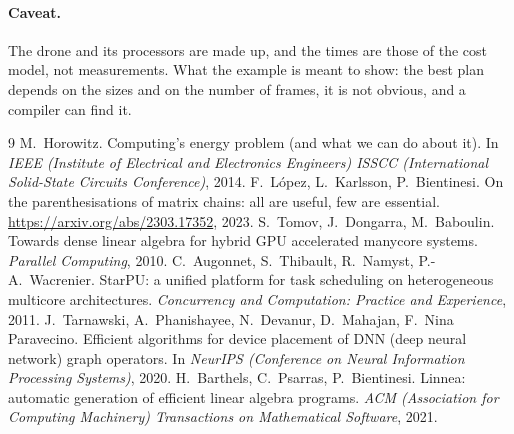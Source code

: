 \documentclass[11pt,a4paper]{article}
\begin{document}
\paragraph{Caveat.} The drone and its processors are made up, and the
times are those of the cost model, not measurements. What the example is
meant to show: the best plan depends on the sizes and on the number of
frames, it is not obvious, and a compiler can find it.

\begin{thebibliography}{9}
 M.~Horowitz. Computing's energy problem (and what we can
  do about it). In \emph{IEEE (Institute of Electrical and Electronics
  Engineers) ISSCC (International Solid-State Circuits Conference)}, 2014.
 F.~López, L.~Karlsson, P.~Bientinesi. On the
  parenthesisations of matrix chains: all are useful, few are essential.
  \url{https://arxiv.org/abs/2303.17352}, 2023.
 S.~Tomov, J.~Dongarra, M.~Baboulin. Towards dense linear
  algebra for hybrid GPU accelerated manycore systems. \emph{Parallel
  Computing}, 2010.
 C.~Augonnet, S.~Thibault, R.~Namyst, P.-A.~Wacrenier.
  StarPU: a unified platform for task scheduling on heterogeneous multicore
  architectures. \emph{Concurrency and Computation: Practice and
  Experience}, 2011.
 J.~Tarnawski, A.~Phanishayee, N.~Devanur, D.~Mahajan,
  F.~Nina Paravecino. Efficient algorithms for device placement of DNN
  (deep neural network) graph operators. In \emph{NeurIPS (Conference on
  Neural Information Processing Systems)}, 2020.
 H.~Barthels, C.~Psarras, P.~Bientinesi. Linnea: automatic
  generation of efficient linear algebra programs. \emph{ACM (Association
  for Computing Machinery) Transactions on Mathematical Software}, 2021.
\end{thebibliography}
\end{document}
